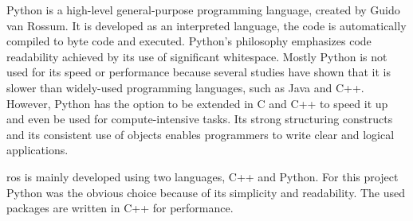 Python is a high\hyp{}level general\hyp{}purpose programming language, created by Guido van Rossum. It is developed as an interpreted language, the code is automatically compiled to byte code and executed. Python's philosophy emphasizes code readability achieved by its use of significant whitespace. Mostly Python is not used for its speed or performance because several studies have shown that it is slower than widely\hyp{}used programming languages, such as Java and C++. However, Python has the option to be extended in C and C++ to speed it up and even be used for compute\hyp{}intensive tasks. Its strong structuring constructs and its consistent use of objects enables programmers to write clear and logical applications. \cite{kuhlman2009python}

\acs{ros} is mainly developed using two languages, C++ and Python. For this project Python was the obvious choice because of its simplicity and readability. The used packages are written in C++ for performance.